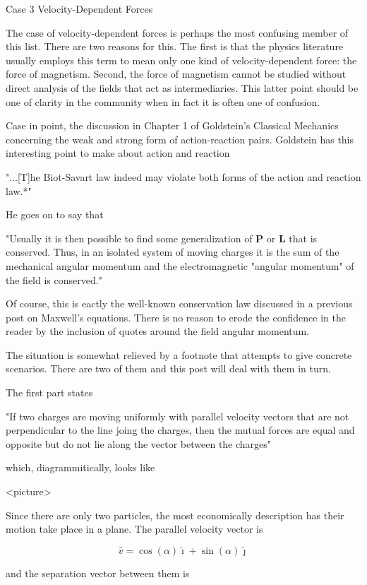 \documentclass[12pt]{article}
\begin{document}
Case 3 Velocity-Dependent Forces

The case of velocity-dependent forces is perhaps the most confusing member of this list.  There are two reasons for this.  The first is that the physics literature usually employs this term to mean only one kind of velocity-dependent force: the force of magnetism.  Second, the force of magnetism cannot be studied without direct analysis of the fields that act as intermediaries.  This latter point should be one of clarity in the community when in fact it is often one of confusion.

Case in point, the discussion in Chapter 1 of Goldstein's Classical Mechanics concerning the weak and strong form of action-reaction pairs.  Goldstein has this interesting point to make about action and reaction

"...[T]he Biot-Savart law indeed may violate both forms of the action and reaction law.*"

He goes on to say that 

"Usually it is then possible to find some generalization of ${\mathbf P}$ or ${\mathbf L}$ that is conserved.  Thus, in an isolated system of moving charges it is the sum of the mechanical angular momentum and the electromagnetic "angular momentum" of the field is conserved."

Of course, this is eactly the well-known conservation law discussed in a previous post on Maxwell's equations.  There is no reason to erode the confidence in the reader by the inclusion of quotes around the field angular momentum.  

The situation is somewhat relieved by a footnote that attempts to give concrete scenarios.  There are two of them and this post will deal with them in turn.

The first part states

"If two charges are moving uniformly with parallel velocity vectors that are not perpendicular to the line joing the charges, then the mutual forces are equal and opposite but do not lie along the vector between the charges"

which, diagrammitically, looks like

<picture>

Since there are only two particles, the most economically description has their motion take place in a plane.  The parallel velocity vector is 

\[ \hat v = \cos(\alpha) \hat \imath + \sin(\alpha) \hat \jmath \]

and the separation vector between them is
\end{document}
